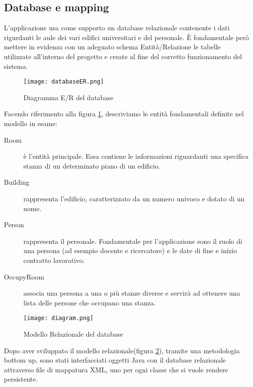 \FloatBarrier
\subsection{Database e mapping}

L'applicazione usa come supporto un database relazionale contenente i dati rigurdanti le aule dei vari edifici universitari e del personale.
\`E fondamentale però mettere in evidenza con un adeguato schema Entità/Relazione le tabelle utilizzate all’interno del progetto e create al fine del corretto funzionamento del 
sistema.

\begin{figure}[!htb]
\centering
\texttt{[image: databaseER.png]}
\caption{Diagramma E/R del database}\label{fig:database}
\end{figure}

Facendo riferimento alla figura \ref{fig:database}, descriviamo le entità fondamentali definite nel modello in esame:
\FloatBarrier
\begin{description}
\item[Room]\`e l'entit\`a principale. Essa contiene le informazioni riguardanti una specifica stanza di un determinato piano di un edificio. 
\item[Building]rappresenta l'edificio, caratterizzato da un numero univoco e dotato di un nome.
\item[Person]rappresenta il personale. Fondamentale per l'applicazione sono il ruolo di una persona (ad esempio docente e ricercatore) e le date di fine e inizio contratto lavorativo.
\item[OccupyRoom]associa una persona a una o pi\`u stanze diverse e  servir\`a ad ottenere una lista delle persone che occupano una stanza.
\end{description}

\FloatBarrier
\begin{figure}[!htb]
\centering
\texttt{[image: diagram.png]}
\caption{Modello Relazionale del database}\label{fig:databaseRelaz}
\end{figure}
\FloatBarrier
Dopo aver sviluppato il modello relazionale(figura \ref{fig:databaseRelaz}), tramite una metodologia bottom up, sono stati interfacciati oggetti Java con il database relazionale attraverso file di mappatura XML, uno per ogni classe che si vuole rendere persistente.\\ 

